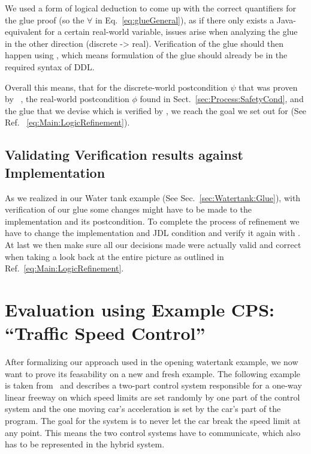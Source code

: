 We used a form of logical deduction to come up with the correct quantifiers for the glue proof (so the \(\forall\) in Eq.~\ref{eq:glueGeneral}), as if there only exists a Java-equivalent for a certain real-world variable, issues arise when analyzing the glue in the other direction (discrete -> real). Verification of the glue should then happen using \keym, which means formulation of the glue should already be in the required syntax of DDL.

Overall this means, that for the discrete-world postcondition \(\psi\) that was proven by \key~, the real-world postcondition \(\phi\) found in Sect.~\ref{sec:Process:SafetyCond}, and the glue that we devise which is verified by \keym, we reach the goal we set out for (See Ref. ~\ref{eq:Main:LogicRefinement}).

\section{Validating Verification results against Implementation}
\label{sec:Process:Eval}

As we realized in our Water tank example (See Sec.~\ref{sec:Watertank:Glue}), with verification of our glue some changes might have to be made to the implementation and its postcondition. To complete the process of refinement we have to change the implementation and JDL condition and verify it again with \key. At last we then make sure all our decisions made were actually valid and correct when taking a look back at the entire picture as outlined in Ref.~\ref{eq:Main:LogicRefinement}.


\chapter{Evaluation using Example CPS: ``Traffic Speed Control''}
\label{ch:Traffic}

After formalizing our approach used in the opening watertank example, we now want to prove its feasability on a new and fresh example. The following example is taken from~\cite{TrafficControl} and describes a two-part control system responsible for a one-way linear freeway on which speed limits are set randomly by one part of the control system and the one moving car's acceleration is set by the car's part of the program. The goal for the system is to never let the car break the speed limit at any point. This means the two control systems have to communicate, which also has to be represented in the hybrid system.  

